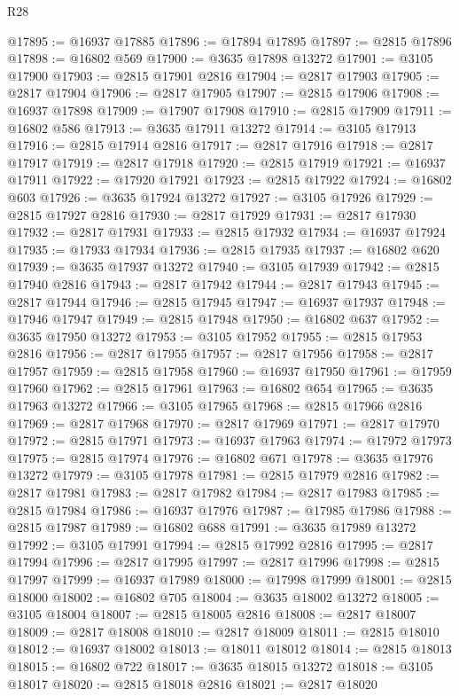 \begin{lexlean}{R28}
\begin{coremodule}
@17895 := @16937 @17885
@17896 := @17894 @17895
@17897 := @2815 @17896
@17898 := @16802 @569
@17900 := @3635 @17898 @13272
@17901 := @3105 @17900
@17903 := @2815 @17901 @2816
@17904 := @2817 @17903
@17905 := @2817 @17904
@17906 := @2817 @17905
@17907 := @2815 @17906
@17908 := @16937 @17898
@17909 := @17907 @17908
@17910 := @2815 @17909
@17911 := @16802 @586
@17913 := @3635 @17911 @13272
@17914 := @3105 @17913
@17916 := @2815 @17914 @2816
@17917 := @2817 @17916
@17918 := @2817 @17917
@17919 := @2817 @17918
@17920 := @2815 @17919
@17921 := @16937 @17911
@17922 := @17920 @17921
@17923 := @2815 @17922
@17924 := @16802 @603
@17926 := @3635 @17924 @13272
@17927 := @3105 @17926
@17929 := @2815 @17927 @2816
@17930 := @2817 @17929
@17931 := @2817 @17930
@17932 := @2817 @17931
@17933 := @2815 @17932
@17934 := @16937 @17924
@17935 := @17933 @17934
@17936 := @2815 @17935
@17937 := @16802 @620
@17939 := @3635 @17937 @13272
@17940 := @3105 @17939
@17942 := @2815 @17940 @2816
@17943 := @2817 @17942
@17944 := @2817 @17943
@17945 := @2817 @17944
@17946 := @2815 @17945
@17947 := @16937 @17937
@17948 := @17946 @17947
@17949 := @2815 @17948
@17950 := @16802 @637
@17952 := @3635 @17950 @13272
@17953 := @3105 @17952
@17955 := @2815 @17953 @2816
@17956 := @2817 @17955
@17957 := @2817 @17956
@17958 := @2817 @17957
@17959 := @2815 @17958
@17960 := @16937 @17950
@17961 := @17959 @17960
@17962 := @2815 @17961
@17963 := @16802 @654
@17965 := @3635 @17963 @13272
@17966 := @3105 @17965
@17968 := @2815 @17966 @2816
@17969 := @2817 @17968
@17970 := @2817 @17969
@17971 := @2817 @17970
@17972 := @2815 @17971
@17973 := @16937 @17963
@17974 := @17972 @17973
@17975 := @2815 @17974
@17976 := @16802 @671
@17978 := @3635 @17976 @13272
@17979 := @3105 @17978
@17981 := @2815 @17979 @2816
@17982 := @2817 @17981
@17983 := @2817 @17982
@17984 := @2817 @17983
@17985 := @2815 @17984
@17986 := @16937 @17976
@17987 := @17985 @17986
@17988 := @2815 @17987
@17989 := @16802 @688
@17991 := @3635 @17989 @13272
@17992 := @3105 @17991
@17994 := @2815 @17992 @2816
@17995 := @2817 @17994
@17996 := @2817 @17995
@17997 := @2817 @17996
@17998 := @2815 @17997
@17999 := @16937 @17989
@18000 := @17998 @17999
@18001 := @2815 @18000
@18002 := @16802 @705
@18004 := @3635 @18002 @13272
@18005 := @3105 @18004
@18007 := @2815 @18005 @2816
@18008 := @2817 @18007
@18009 := @2817 @18008
@18010 := @2817 @18009
@18011 := @2815 @18010
@18012 := @16937 @18002
@18013 := @18011 @18012
@18014 := @2815 @18013
@18015 := @16802 @722
@18017 := @3635 @18015 @13272
@18018 := @3105 @18017
@18020 := @2815 @18018 @2816
@18021 := @2817 @18020

\end{coremodule}
\end{lexlean}
